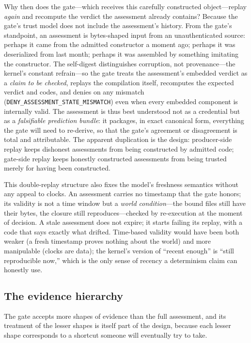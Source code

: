 Why then does the gate---which receives this carefully constructed object---replay \emph{again} and recompute the verdict the assessment already contains? Because the gate's trust model does not include the assessment's history. From the gate's standpoint, an assessment is bytes-shaped input from an unauthenticated source: perhaps it came from the admitted constructor a moment ago; perhaps it was deserialized from last month; perhaps it was assembled by something imitating the constructor. The self-digest distinguishes corruption, not provenance---the kernel's constant refrain---so the gate treats the assessment's embedded verdict as a \emph{claim to be checked}, replays the compilation itself, recomputes the expected verdict and codes, and denies on any mismatch (\texttt{DENY\_ASSESSMENT\_STATE\_MISMATCH}) even when every embedded component is internally valid. The assessment is thus best understood not as a credential but as a \emph{falsifiable prediction bundle}: it packages, in exact canonical form, everything the gate will need to re-derive, so that the gate's agreement or disagreement is total and attributable. The apparent duplication is the design: producer-side replay keeps dishonest assessments from being constructed by admitted code; gate-side replay keeps honestly constructed assessments from being trusted merely for having been constructed.

This double-replay structure also fixes the model's freshness semantics without any appeal to clocks. An assessment carries no timestamp that the gate honors; its validity is not a time window but a \emph{world condition}---the bound files still have their bytes, the closure still reproduces---checked by re-execution at the moment of decision. A stale assessment does not expire; it starts failing its replay, with a code that says exactly what drifted. Time-based validity would have been both weaker (a fresh timestamp proves nothing about the world) and more manipulable (clocks are data); the kernel's version of ``recent enough'' is ``still reproducible now,'' which is the only sense of recency a determinism claim can honestly use.

\subsection{The evidence hierarchy}\label{ch09:hierarchy}

The gate accepts more shapes of evidence than the full assessment, and its treatment of the lesser shapes is itself part of the design, because each lesser shape corresponds to a shortcut someone will eventually try to take.

